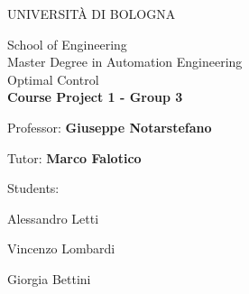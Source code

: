 \documentclass[a4paper,11pt,oneside]{book}
\begin{document}
\pagestyle{myheadings}

\thispagestyle{empty}                                                 
\begin{center}                                                            
    \vspace{5mm}
    {\LARGE UNIVERSIT\`A DI BOLOGNA}
    \vspace{5mm}
\end{center}
\begin{center}
\end{center}
\begin{center}
      \vspace{5mm}
      {\LARGE School of Engineering} \\
        \vspace{3mm}
      {\Large Master Degree in Automation Engineering} \\
      \vspace{20mm}
      {\LARGE Optimal Control} \\
      \vspace{5mm}
      {\Large\textbf{Course Project 1 - Group 3}} \\
      \vspace{15mm}
\end{center}
\begin{flushleft}                                                                              
     {\large Professor: \textbf{Giuseppe Notarstefano}}   
      
\end{flushleft}
\begin{flushleft}                                                                              
     {\large Tutor: \textbf{Marco Falotico}} 
     \vspace{13mm}
\end{flushleft}
\begin{flushright}
      {\large Students:}
\end{flushright}        %
\begin{flushright}
      {\large Alessandro Letti}
\end{flushright}        %
\begin{flushright}
      {\large Vincenzo Lombardi}
\end{flushright}        %
\begin{flushright}
      {\large Giorgia Bettini}
\end{flushright}        %
\end{document}
